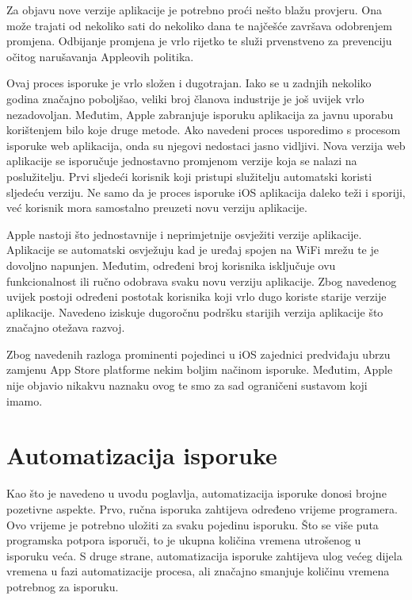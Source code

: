 \documentclass[times, utf8, diplomski, numeric]{fer}
\begin{document}
Za objavu nove verzije aplikacije je potrebno proći nešto blažu provjeru. Ona može trajati od nekoliko sati do nekoliko dana te najčešće završava odobrenjem promjena. Odbijanje promjena je vrlo rijetko te služi prvenstveno za prevenciju očitog narušavanja Appleovih politika.

Ovaj proces isporuke je vrlo složen i dugotrajan. Iako se u zadnjih nekoliko godina značajno poboljšao, veliki broj članova industrije je još uvijek vrlo nezadovoljan. Međutim, Apple zabranjuje isporuku aplikacija za javnu uporabu korištenjem bilo koje druge metode. Ako navedeni proces usporedimo s procesom isporuke web aplikacija, onda su njegovi nedostaci jasno vidljivi. Nova verzija web aplikacije se isporučuje jednostavno promjenom verzije koja se nalazi na poslužitelju. Prvi sljedeći korisnik koji pristupi služitelju automatski koristi sljedeću verziju. Ne samo da je proces isporuke iOS aplikacija daleko teži i sporiji, već korisnik mora samostalno preuzeti novu verziju aplikacije.

Apple nastoji što jednostavnije i neprimjetnije osvježiti verzije aplikacije. Aplikacije se automatski osvježuju kad je uređaj spojen na WiFi mrežu te je dovoljno napunjen. Međutim, određeni broj korisnika isključuje ovu funkcionalnost ili ručno odobrava svaku novu verziju aplikacije. Zbog navedenog uvijek postoji određeni postotak korisnika koji vrlo dugo koriste starije verzije aplikacije. Navedeno iziskuje dugoročnu podršku starijih verzija aplikacije što značajno otežava razvoj.

Zbog navedenih razloga prominenti pojedinci u iOS zajednici predviđaju ubrzu zamjenu App Store platforme nekim boljim načinom isporuke. Međutim, Apple nije objavio nikakvu naznaku ovog te smo za sad ograničeni sustavom koji imamo.


\section{Automatizacija isporuke} \label{header:Automatizacija_isporuke}

Kao što je navedeno u uvodu poglavlja, automatizacija isporuke donosi brojne pozetivne aspekte. Prvo, ručna isporuka zahtijeva određeno vrijeme programera. Ovo vrijeme je potrebno uložiti za svaku pojedinu isporuku. Što se više puta programska potpora isporuči, to je ukupna količina vremena utrošenog u isporuku veća. S druge strane, automatizacija isporuke zahtijeva ulog većeg dijela vremena u fazi automatizacije procesa, ali značajno smanjuje količinu vremena potrebnog za isporuku.
\end{document}
